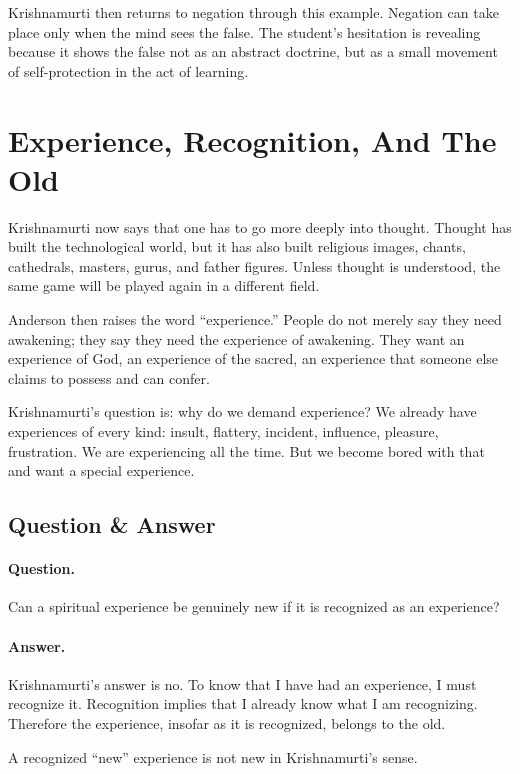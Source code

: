 Krishnamurti then returns to negation through this example. Negation can take place only when the mind sees the false. The student's hesitation is revealing because it shows the false not as an abstract doctrine, but as a small movement of self-protection in the act of learning.

\section{Experience, Recognition, And The Old}

Krishnamurti now says that one has to go more deeply into thought. Thought has built the technological world, but it has also built religious images, chants, cathedrals, masters, gurus, and father figures. Unless thought is understood, the same game will be played again in a different field.

Anderson then raises the word ``experience.'' People do not merely say they need awakening; they say they need the experience of awakening. They want an experience of God, an experience of the sacred, an experience that someone else claims to possess and can confer.

Krishnamurti's question is: why do we demand experience? We already have experiences of every kind: insult, flattery, incident, influence, pleasure, frustration. We are experiencing all the time. But we become bored with that and want a special experience.

\subsection{Question \& Answer}

\paragraph{Question.}
Can a spiritual experience be genuinely new if it is recognized as an experience?

\paragraph{Answer.}
Krishnamurti's answer is no. To know that I have had an experience, I must recognize it. Recognition implies that I already know what I am recognizing. Therefore the experience, insofar as it is recognized, belongs to the old.

\begin{proposition}
A recognized ``new'' experience is not new in Krishnamurti's sense.
\end{proposition}

